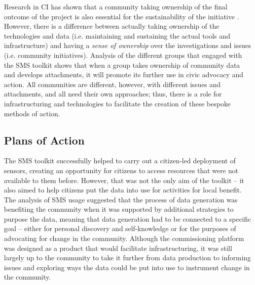 Research in CI has shown that a community taking ownership of the final outcome of the project is also essential for the sustainability of the initiative \citep{merkel_participatory_2004,carroll_participatory_2007}. However, there is a difference between actually taking ownership of the technologies and data (i.e. maintaining and sustaining the actual tools and infrastructure) and having a \textit{sense of ownership} over the investigations and issues (i.e. community initiatives). Analysis of the different groups that engaged with the SMS toolkit shows that when a group takes ownership of community data and develops attachments, it will promote its further use in civic advocacy and action. All communities are different, however, with different issues and attachments, and all need their own approaches; thus, there is a role for infrastructuring and technologies to facilitate the creation of these bespoke methods of action.

\subsection{Plans of Action}
The SMS toolkit successfully helped to carry out a citizen-led deployment of sensors, creating an opportunity for citizens to access resources that were not available to them before. However, that was not the only aim of the toolkit -- it also aimed to help citizens put the data into use for activities for local benefit. The analysis of SMS usage suggested that the process of data generation was benefiting the community when it was supported by additional strategies to purpose the data, meaning that data generation had to be connected to a specific goal -- either for personal discovery and self-knowledge or for the purposes of advocating for change in the community. Although the commissioning platform was designed as a product that would facilitate infrastructuring, it was still largely up to the community to take it further from data production to informing issues and exploring ways the data could be put into use to instrument change in the community.

